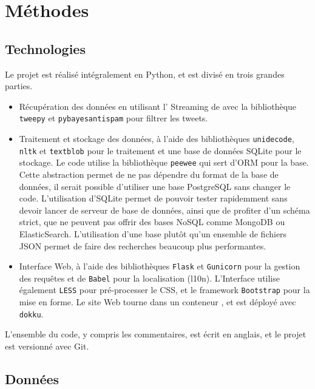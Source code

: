 
\section{Méthodes}

\subsection{Technologies}

Le projet est réalisé intégralement en Python, et est divisé en trois grandes
parties.

\begin{itemize}
  \item Récupération des données en utilisant l’\api{} Streaming de \twt{} avec
    la bibliothèque \verb|tweepy| et \verb|pybayesantispam| pour filtrer les
    tweets.
  \item Traitement et stockage des données, à l’aide des bibliothèques
    \verb|unidecode|, \verb|nltk| et \verb|textblob| pour le traitement et une
    base de données SQLite pour le stockage. Le code utilise la bibliothèque
    \verb|peewee| qui sert d’ORM pour la base. Cette abstraction permet de ne
    pas dépendre du format de la base de données, il serait possible d’utiliser
    une base PostgreSQL sans changer le code. L’utilisation d’SQLite permet de
    pouvoir tester rapidemment sans devoir lancer de serveur de base de
    données, ainsi que de profiter d’un schéma strict, que ne peuvent pas
    offrir des bases NoSQL comme MongoDB ou ElasticSearch. L’utilisation d’une
    base plutôt qu’un ensemble de fichiers JSON permet de faire des recherches
    beaucoup plus performantes.
  \item Interface Web, à l’aide des bibliothèques \verb|Flask| et
    \verb|Gunicorn| pour la gestion des requêtes et de \verb|Babel| pour la
    localisation (l10n). L’Interface utilise également \verb|LESS| pour
    pré-processer le CSS, et le framework \verb|Bootstrap| pour la mise en
    forme. Le site Web tourne dans un conteneur , et est déployé avec
    \verb|dokku|.
\end{itemize}

L’ensemble du code, y compris les commentaires, est écrit en anglais, et le
projet est versionné avec Git.

\subsection{Données}

